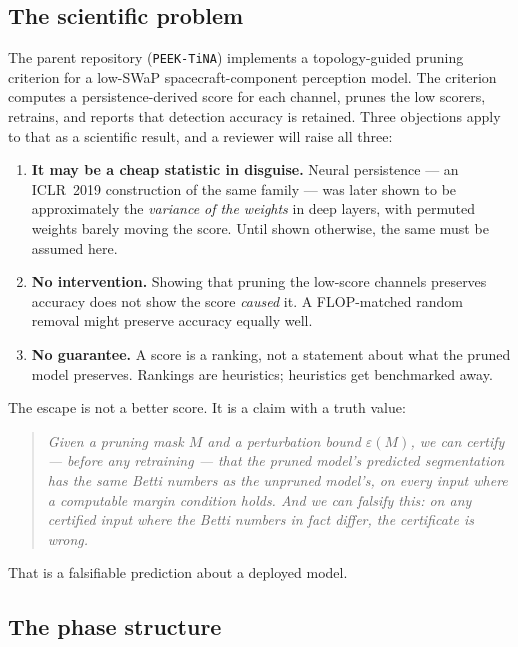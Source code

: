 \documentclass[11pt]{article}
\newcommand{\code}[1]{\texttt{\small #1}}
\theoremstyle{definition}
\theoremstyle{plain}
\begin{document}
\subsection{The scientific problem}

The parent repository (\code{PEEK-TiNA}) implements a topology-guided pruning
criterion for a low-SWaP spacecraft-component perception model. The criterion
computes a persistence-derived score for each channel, prunes the low scorers,
retrains, and reports that detection accuracy is retained. Three objections apply
to that as a scientific result, and a reviewer will raise all three:

\begin{enumerate}[label=(\roman*)]
\item \textbf{It may be a cheap statistic in disguise.} Neural persistence --- an
ICLR~2019 construction of the same family --- was later shown to be
approximately the \emph{variance of the weights} in deep layers, with permuted
weights barely moving the score. Until shown otherwise, the same must be assumed
here.
\item \textbf{No intervention.} Showing that pruning the low-score channels
preserves accuracy does not show the score \emph{caused} it. A FLOP-matched
random removal might preserve accuracy equally well.
\item \textbf{No guarantee.} A score is a ranking, not a statement about what the
pruned model preserves. Rankings are heuristics; heuristics get benchmarked
away.
\end{enumerate}

The escape is not a better score. It is a claim with a truth value:

\begin{quote}
\emph{Given a pruning mask $M$ and a perturbation bound $\varepsilon(M)$, we can
certify --- before any retraining --- that the pruned model's predicted
segmentation has the same Betti numbers as the unpruned model's, on every input
where a computable margin condition holds. And we can falsify this: on any
certified input where the Betti numbers in fact differ, the certificate is
wrong.}
\end{quote}

That is a falsifiable prediction about a deployed model.

\subsection{The phase structure}
\end{document}
